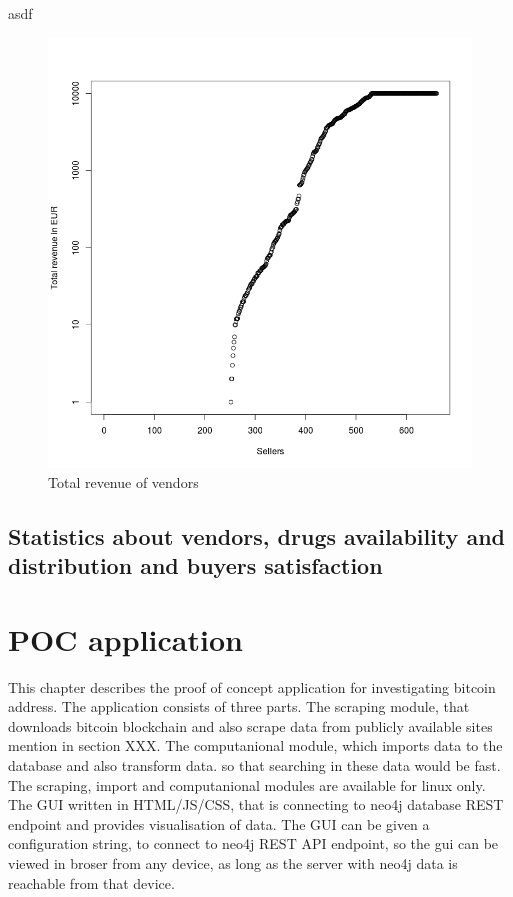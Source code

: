 \documentclass[
  digital, %
  table,   %
  lof,     %
  lot,     %
  oneside
]{fithesis3}
\begin{document}
asdf
\begin{figure}[!htb]
    \centering
    \includegraphics[scale=0.4]{total-rev}
    \caption{Total revenue of vendors}
    \label{Vendors by total revenue}
\end{figure}

\section{Statistics about vendors, drugs availability and distribution and buyers satisfaction}



\chapter{POC application}

This chapter describes the proof of concept application for investigating bitcoin address.
The application consists of three parts.
The scraping module, that downloads bitcoin blockchain and also scrape data from publicly available sites mention in section XXX.
The computanional module, which imports data to the database and also transform data. so that searching in these data would be fast.
The scraping, import and computanional modules are available for linux only.
The GUI written in HTML/JS/CSS, that is connecting to neo4j database REST endpoint and provides visualisation of data.
The GUI can be given a configuration string, to connect to neo4j REST API endpoint, so the gui can be viewed in broser from any device, as long as 
the server with neo4j data is reachable from that device.
\end{document}
